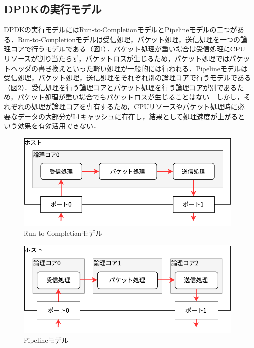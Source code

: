 \subsection{DPDKの実行モデル}
DPDKの実行モデルにはRun-to-CompletionモデルとPipelineモデルの二つがある．Run-to-Completionモデルは受信処理，パケット処理，送信処理を一つの論理コアで行うモデルである（図\ref{fig:RunToCompletion}）．パケット処理が重い場合は受信処理にCPUリソースが割り当たらず，パケットロスが生じるため，パケット処理ではパケットヘッダの書き換えといった軽い処理が一般的には行われる．Pipelineモデルは受信処理，パケット処理，送信処理をそれぞれ別の論理コアで行うモデルである（図\ref{fig:Pipeline}）．受信処理を行う論理コアとパケット処理を行う論理コアが別であるため，パケット処理が重い場合でもパケットロスが生じることはない．しかし，それぞれの処理が論理コアを専有するため，CPUリソースやパケット処理時に必要なデータの大部分がL1キャッシュに存在し，結果として処理速度が上がるという効果を有効活用できない．

\begin{figure}[htb]
  \centering
  \includegraphics[width=\columnwidth]{pictures/RunToCompletion.pdf}
  \caption{Run-to-Completionモデル}
  \label{fig:RunToCompletion}
\end{figure}

\begin{figure}[htb]
  \centering
  \includegraphics[width=\columnwidth]{pictures/Pipeline.pdf}
  \caption{Pipelineモデル}
  \label{fig:Pipeline}
\end{figure}

